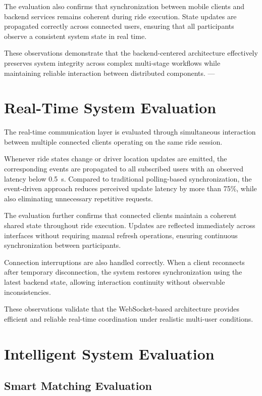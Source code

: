 The evaluation also confirms that synchronization between mobile clients and backend services remains coherent during ride execution. State updates are propagated correctly across connected users, ensuring that all participants observe a consistent system state in real time.

These observations demonstrate that the backend-centered architecture effectively preserves system integrity across complex multi-stage workflows while maintaining reliable interaction between distributed components.
---

\section{Real-Time System Evaluation}

The real-time communication layer is evaluated through simultaneous interaction between multiple connected clients operating on the same ride session.

Whenever ride states change or driver location updates are emitted, the corresponding events are propagated to all subscribed users with an observed latency below 0.5~s. Compared to traditional polling-based synchronization, the event-driven approach reduces perceived update latency by more than 75\%, while also eliminating unnecessary repetitive requests.

The evaluation further confirms that connected clients maintain a coherent shared state throughout ride execution. Updates are reflected immediately across interfaces without requiring manual refresh operations, ensuring continuous synchronization between participants.

Connection interruptions are also handled correctly. When a client reconnects after temporary disconnection, the system restores synchronization using the latest backend state, allowing interaction continuity without observable inconsistencies.

These observations validate that the WebSocket-based architecture provides efficient and reliable real-time coordination under realistic multi-user conditions.


\section{Intelligent System Evaluation}

\subsection{Smart Matching Evaluation}


